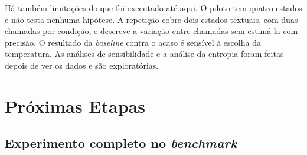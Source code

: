 \documentclass[12pt,oneside,a4paper,chapter=TITLE,english,brazil]{abntex2}
\begin{document}
Há também limitações do que foi executado até aqui. O piloto tem quatro estados e não testa nenhuma hipótese. A repetição cobre dois estados textuais, com duas chamadas por condição, e descreve a variação entre chamadas sem estimá-la com precisão. O resultado da \textit{baseline} contra o acaso é sensível à escolha da temperatura. As análises de sensibilidade e a análise da entropia foram feitas depois de ver os dados e são exploratórias.

\section{Próximas Etapas}
\label{sec:proximas}

\subsection{Experimento completo no \textit{benchmark}}
\label{sec:plano}
\end{document}
